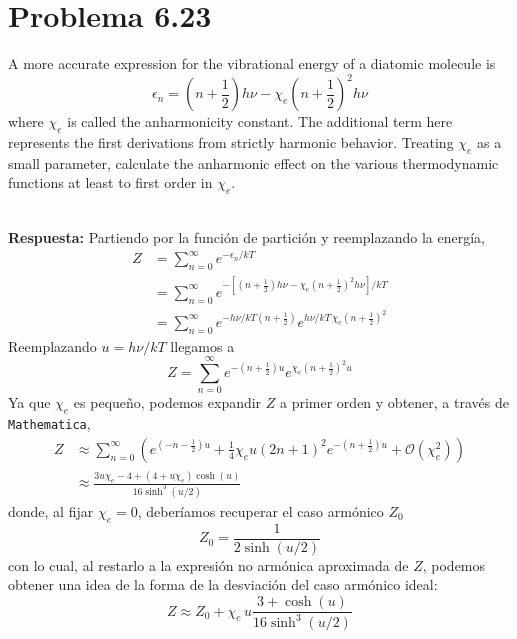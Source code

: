 \documentclass[]{article}
\numberwithin{equation}{section}
\newcommand{\0}{\textcolor{gray}{0}}
\newcommand{\resp}{
	\\
	
	\textbf{Respuesta:} }
\begin{document}
\section{Problema 6.23}
A more accurate expression for the vibrational energy of a diatomic molecule is
\begin{equation}
	\epsilon_n = \left(n + \frac{1}{2}\right)h\nu - \chi_e \left(n + \frac{1}{2}\right)^2 h\nu
\end{equation}
where $\chi_e$ is called the anharmonicity constant. The additional term here represents the first derivations from strictly harmonic behavior. Treating $\chi_e$ as a small parameter, calculate the anharmonic effect on the various thermodynamic functions at least to first order in $\chi_e$.
\resp Partiendo por la función de partición y reemplazando la energía,
\begin{align*}
	Z &= \sum_{n=0}^\infty e^{-\epsilon_n/kT}\\
	&=\sum_{n=0}^\infty e^{-\left[\left(n + \frac{1}{2}\right)h\nu - \chi_e \left(n + \frac{1}{2}\right)^2 h\nu\right]/kT}\\
	&=\sum_{n=0}^\infty e^{-h\nu/kT \left(n + \frac{1}{2}\right)} e^{h\nu/kT \, \chi_e \left(n + \frac{1}{2}\right)^2}
\end{align*}
Reemplazando $u = h\nu/kT$ llegamos a
\begin{equation}
	Z = \sum_{n=0}^\infty e^{-\left(n + \frac{1}{2}\right) u} e^{\chi_e \left(n + \frac{1}{2}\right)^2 u}
\end{equation}
Ya que $\chi_e$ es pequeño, podemos expandir $Z$ a primer orden y obtener, a través de \texttt{Mathematica},
\begin{align}
	Z &\approx \sum _{n=0}^{\infty } \left(e^{\left(-n-\frac{1}{2}\right) u} + \frac{1}{4} \chi_e u (2 n+1)^2 e^{-\left(n+\frac{1}{2}\right) u} + \mathcal{O}\left(\chi_e ^2\right)\right)\\
	&\approx \frac{3 u \chi_e - 4 + (4 + u \chi_e) \cosh (u)}{16 \sinh^3\left(u/2\right)}
\end{align}
donde, al fijar $\chi_e = 0$, deberíamos recuperar el caso armónico $Z_0$
\begin{equation}
	Z_0 = \frac{1}{2 \sinh(u/2)}
\end{equation}
con lo cual, al restarlo a la expresión no armónica aproximada de $Z$, podemos obtener una idea de la forma de la desviación del caso armónico ideal:
\begin{equation}
	Z \approx Z_0 + \chi_e \, u \frac{3 + \cosh (u)}{16 \sinh^3\left(u/2\right)}
\end{equation}
\end{document}
